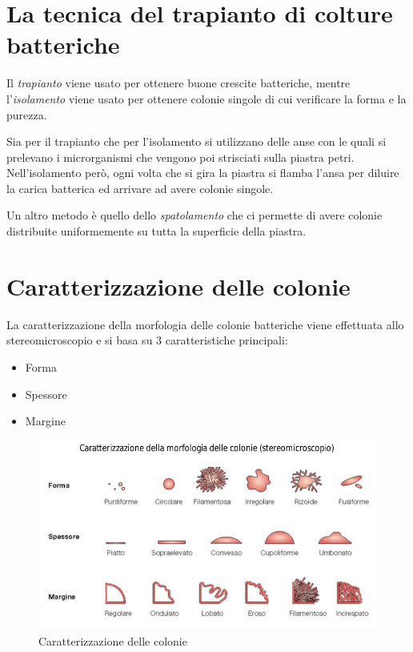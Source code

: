 \documentclass[11pt]{book}
\begin{document}
\section{La tecnica del trapianto di colture batteriche}
Il \emph{trapianto} viene usato per ottenere buone crescite batteriche, mentre l'\emph{isolamento} viene usato per ottenere colonie singole di cui verificare la forma e la purezza.

Sia per il trapianto che per l'isolamento si utilizzano delle anse con le quali si prelevano i microrganismi che vengono poi strisciati sulla piastra petri. Nell'isolamento però, ogni volta che si gira la piastra si flamba l'ansa per diluire la carica batterica ed arrivare ad avere colonie singole.

Un altro metodo è quello dello \emph{spatolamento} che ci permette di avere colonie distribuite uniformemente su tutta la superficie della piastra.

\clearpage
\section{Caratterizzazione delle colonie}
La caratterizzazione della morfologia delle colonie batteriche viene effettuata allo stereomicroscopio e si basa su 3 caratteristiche principali:
\begin{itemize}
\item Forma 
\item Spessore
\item Margine
\end{itemize}

\begin{figure}[htp]
\centering
\includegraphics[scale=0.4]{img/Forma delle colonie.png}
\caption{Caratterizzazione delle colonie}
\label{}
\end{figure}
\end{document}
